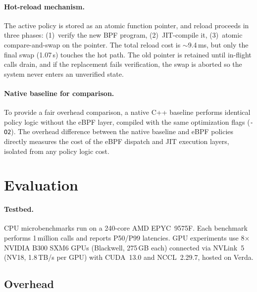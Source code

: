 \documentclass[sigplan,10pt]{acmart}
\newcommand{\us}{\,\textmu{}s\xspace}
\begin{document}
\paragraph{Hot-reload mechanism.}
The active policy is stored as an atomic function pointer, and reload
proceeds in three phases: (1)~verify the new BPF program, (2)~JIT-compile it,
(3)~atomic compare-and-swap on the pointer. The total reload cost is
$\sim$9.4\,ms, but only the final swap (1.07\us) touches the hot path.
The old pointer is retained until in-flight calls drain, and if the
replacement fails verification, the swap is aborted so the system
never enters an unverified state.

\paragraph{Native baseline for comparison.}
To provide a fair overhead comparison, a native C++
baseline performs identical policy logic without the eBPF layer,
compiled with the same optimization flags (\texttt{-O2}). The
overhead difference between the native baseline and eBPF policies
directly measures the cost of the eBPF dispatch and JIT execution
layers, isolated from any policy logic cost.

\section{Evaluation}
\label{sec:eval}

\paragraph{Testbed.}
CPU microbenchmarks run on a 240-core AMD EPYC~9575F. Each benchmark
performs 1\,million calls and reports P50/P99 latencies. GPU
experiments use 8$\times$ NVIDIA B300 SXM6 GPUs (Blackwell,
275\,GB each) connected via NVLink~5 (NV18, 1.8\,TB/s per GPU)
with CUDA~13.0 and NCCL~2.29.7, hosted on Verda.

\subsection{Overhead}
\label{sec:eval-overhead}
\end{document}
